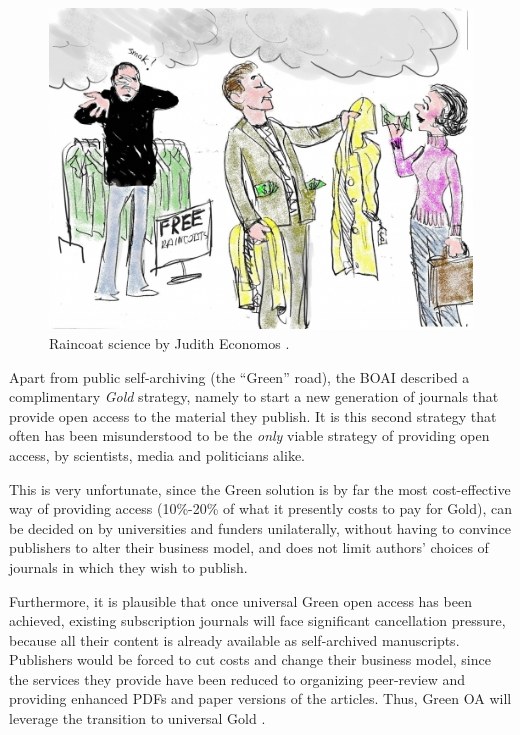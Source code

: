 \documentclass[11pt, openany, oneside, article, a4paper, twocolumn]{memoir}
\begin{document}
\begin{figure}
  \includegraphics[width=\columnwidth]{rain4.jpg}
  \caption{Raincoat science by Judith Economos \cite{economos}.}\label{fig:raincoat_science}
\end{figure}

Apart from public self-archiving (the \enquote{Green} road), the BOAI
described a complimentary \emph{Gold} strategy, namely to start a new
generation of journals that provide open access to the material they
publish. It is this second strategy that often has been misunderstood to
be the \emph{only} viable strategy of providing open access, by
scientists, media and politicians alike.

This is very unfortunate, since the Green solution is by far the most
cost-effective way of providing access \cite{houghton2013planting}
(10\%-20\% of what it presently costs to pay for Gold), can be decided on
by universities and funders unilaterally, without having to convince
publishers to alter their business model, and does not limit authors'
choices of journals in which they wish to publish.

Furthermore, it is plausible that once universal Green open access has been
achieved, existing subscription journals will face significant cancellation
pressure, because all their content is already available as self-archived
manuscripts. Publishers would be forced to cut costs and change their
business model, since the services they provide have been reduced to organizing
peer-review and providing enhanced PDFs and paper versions of the articles.
Thus, Green OA will leverage the transition to universal Gold
\cite{harnad2007green_road}.
\end{document}
